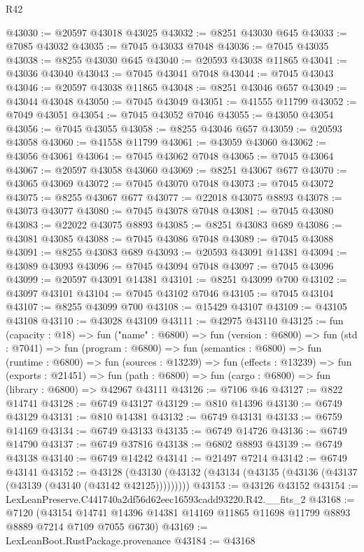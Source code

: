 \begin{lexlean}{R42}
\begin{coremodule}
{@43030 := @20597 @43018 @43025
@43032 := @8251 @43030 @645
@43033 := @7085 @43032
@43035 := @7045 @43033 @7048
@43036 := @7045 @43035
@43038 := @8255 @43030 @645
@43040 := @20593 @43038 @11865
@43041 := @43036 @43040
@43043 := @7045 @43041 @7048
@43044 := @7045 @43043
@43046 := @20597 @43038 @11865
@43048 := @8251 @43046 @657
@43049 := @43044 @43048
@43050 := @7045 @43049
@43051 := @41555 @11799
@43052 := @7049 @43051
@43054 := @7045 @43052 @7046
@43055 := @43050 @43054
@43056 := @7045 @43055
@43058 := @8255 @43046 @657
@43059 := @20593 @43058
@43060 := @41558 @11799
@43061 := @43059 @43060
@43062 := @43056 @43061
@43064 := @7045 @43062 @7048
@43065 := @7045 @43064
@43067 := @20597 @43058 @43060
@43069 := @8251 @43067 @677
@43070 := @43065 @43069
@43072 := @7045 @43070 @7048
@43073 := @7045 @43072
@43075 := @8255 @43067 @677
@43077 := @22018 @43075 @8893
@43078 := @43073 @43077
@43080 := @7045 @43078 @7048
@43081 := @7045 @43080
@43083 := @22022 @43075 @8893
@43085 := @8251 @43083 @689
@43086 := @43081 @43085
@43088 := @7045 @43086 @7048
@43089 := @7045 @43088
@43091 := @8255 @43083 @689
@43093 := @20593 @43091 @14381
@43094 := @43089 @43093
@43096 := @7045 @43094 @7048
@43097 := @7045 @43096
@43099 := @20597 @43091 @14381
@43101 := @8251 @43099 @700
@43102 := @43097 @43101
@43104 := @7045 @43102 @7046
@43105 := @7045 @43104
@43107 := @8255 @43099 @700
@43108 := @15429 @43107
@43109 := @43105 @43108
@43110 := @43028 @43109
@43111 := @42975 @43110
@43125 := fun (capacity : @18) =>
  fun ("name" : @6800) =>
  fun (version : @6800) =>
  fun (std : @7041) =>
  fun (program : @6800) =>
  fun (semantics : @6800) =>
  fun (runtime : @6800) =>
  fun (sources : @13239) =>
  fun (effects : @13239) =>
  fun (exports : @21451) =>
  fun (path : @6800) => fun (cargo : @6800) => fun (library : @6800) => @42967 @43111
@43126 := @7106 @46
@43127 := @822 @14741
@43128 := @6749 @43127
@43129 := @810 @14396
@43130 := @6749 @43129
@43131 := @810 @14381
@43132 := @6749 @43131
@43133 := @6759 @14169
@43134 := @6749 @43133
@43135 := @6749 @14726
@43136 := @6749 @14790
@43137 := @6749 @37816
@43138 := @6802 @8893
@43139 := @6749 @43138
@43140 := @6749 @14242
@43141 := @21497 @7214
@43142 := @6749 @43141
@43152 := @43128
    (@43130 (@43132 (@43134 (@43135 (@43136 (@43137 (@43139 (@43140 (@43142 @42125)))))))))
@43153 := @43126 @43152
@43154 := LexLeanPreserve.C441740a2df56d62eec16593cadd93220.R42.__fits_2
@43168 := @7120
    (@43154 @14741 @14396 @14381 @14169 @11865 @11698 @11799 @8893 @8889 @7214 @7109 @7055 @6730)
@43169 := LexLeanBoot.RustPackage.provenance
@43184 := @43168
}
\end{coremodule}
\end{lexlean}
